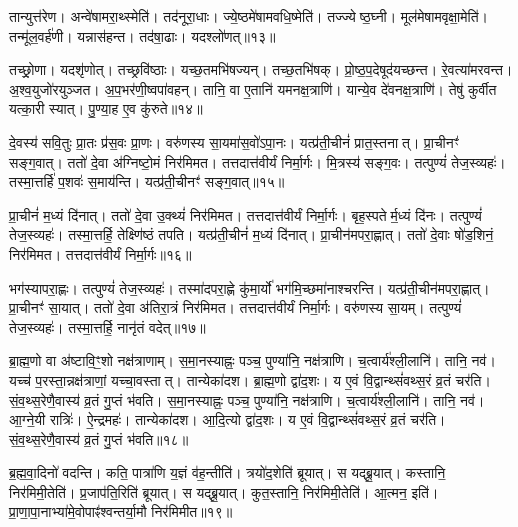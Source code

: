 तान्युत्त॑रेण।
अन्वे॑षामरा॒थ्स्मेति॑।
तद॑नूरा॒धाः।
ज्ये॒ष्ठमे॑षाम\-वधि॒ष्मेति॑।
तज्ज्येष्ठ॒घ्नी।
मूल॑मेषामवृक्षा॒मेति॑।
तन्मू॑ल॒वर्\mbox{}ह॑णी।
यन्नास॑हन्त।
तद॑षा॒ढाः।
यदश्लो॑णत्॥१३॥

तच्छ्रो॒णा।
यदशृ॑णोत्।
तच्छ्रवि॑ष्ठाः।
यच्छ॒तमभि॑षज्यन्।
तच्छ॒तभि॑षक्।
प्रो॒ष्ठ॒प॒देषूद॑यच्छन्त।
रे॒वत्या॑मरवन्त।
अ॒श्व॒युजो॑रयुञ्जत।
अ॒प॒भर॑णी॒ष्वपा॑वहन्।
तानि॒ वा ए॒तानि॑ यमनक्ष॒त्राणि॑।
यान्ये॒व दे॑वनक्ष॒त्राणि॑।
तेषु॑ कुर्वीत यत्का॒री स्यात्।
पु॒ण्या॒ह ए॒व कु॑रुते॥१४॥

दे॒वस्य॑ सवि॒तुः प्रा॒तः प्र॑स॒वः प्रा॒णः।
वरु॑णस्य सा॒यमा॑स॒वो॑\-ऽपा॒नः।
यत्प्र॑ती॒चीनं॑ प्रात॒स्तनात्।
प्रा॒चीनꣳ॑ सङ्ग॒वात्।
ततो॑ दे॒वा अ॑ग्निष्टो॒मं निर॑मिमत।
तत्तदात्त॑वीर्यं निर्मा॒र्गः।
मि॒त्रस्य॑ सङ्ग॒वः।
तत्पुण्यं॑ तेज॒स्व्यहः॑।
तस्मा॒त्तर्\mbox{}हि॑ प॒शवः॑ स॒माय॑न्ति।
यत्प्र॑ती॒चीनꣳ॑ सङ्ग॒वात्॥१५॥

प्रा॒चीनं॑ म॒ध्यं दि॑नात्।
ततो॑ दे॒वा उ॒क्थ्यं॑ निर॑मिमत।
तत्तदात्त॑वीर्यं निर्मा॒र्गः।
बृह॒स्पतेर्म॒ध्यं दि॑नः।
तत्पुण्यं॑ तेज॒स्व्यहः॑।
तस्मा॒त्तर्\mbox{}हि॒ तेक्ष्णि॑ष्ठं तपति।
यत्प्र॑ती॒चीनं॑ म॒ध्यं दि॑नात्।
प्रा॒चीन॑मपरा॒ह्णात्।
ततो॑ दे॒वाः षो॑ड॒शिनं॒ निर॑मिमत।
तत्तदात्त॑वीर्यं निर्मा॒र्गः॥१६॥

भग॑स्यापरा॒ह्णः।
तत्पुण्यं॑ तेज॒स्व्यहः॑।
तस्मा॑दपरा॒ह्णे कु॑मा॒र्यो॑ भग॑मि॒च्छमा॑नाश्चरन्ति।
यत्प्र॑ती॒चीन॑मपरा॒ह्णात्।
प्रा॒चीनꣳ॑ सा॒यात्।
ततो॑ दे॒वा अ॑तिरा॒त्रं निर॑मिमत।
तत्तदात्त॑वीर्यं निर्मा॒र्गः।
वरु॑णस्य सा॒यम्।
तत्पुण्यं॑ तेज॒स्व्यहः॑।
तस्मा॒त्तर्\mbox{}हि॒ नानृ॑तं वदेत्॥१७॥

ब्रा॒ह्म॒णो वा अ॑ष्टावि॒ꣳ॒शो नक्ष॑त्राणाम्।
स॒मा॒नस्याह्नः॒ पञ्च॒ पुण्या॑नि॒ नक्ष॑त्राणि।
च॒त्वार्य॑श्ली॒लानि॑।
तानि॒ नव॑।
यच्च॑ प॒रस्ता॒न्नक्ष॑त्राणां॒ यच्चा॒वस्तात्।
तान्येका॑दश।
ब्रा॒ह्म॒णो द्वा॑द॒शः।
य ए॒वं वि॒द्वान्थ्सं॑वथ्स॒रं व्र॒तं चर॑ति।
सं॒व॒थ्स॒रेणै॒वास्य॑ व्र॒तं गु॒प्तं भ॑वति।
स॒मा॒नस्याह्नः॒ पञ्च॒ पुण्या॑नि॒ नक्ष॑त्राणि।
च॒त्वार्य॑श्ली॒लानि॑।
तानि॒ नव॑।
आ॒ग्ने॒यी रात्रिः॑।
ऐ॒न्द्रमहः॑।
तान्येका॑दश।
आ॒दि॒त्यो द्वा॑द॒शः।
य ए॒वं वि॒द्वान्थ्सं॑वथ्स॒रं व्र॒तं चर॑ति।
सं॒व॒थ्स॒रेणै॒वास्य॑ व्र॒तं गु॒प्तं भ॑वति॥१८॥\anuvakamend[स॒ङ्ग॒वाथ्षो॑ड॒शिनं॒ निर॑मिमत॒ तत्तदात्त॑वीर्यं निर्मा॒र्गो व॑देद्भवति समा॒नस्याह्नः॒ पञ्च॒ पुण्या॑नि॒ नक्ष॑त्राण्य॒ष्टौ च॑]

ब्र॒ह्म॒वा॒दिनो॑ वदन्ति।
कति॒ पात्रा॑णि य॒ज्ञं व॑ह॒न्तीति॑।
त्रयो॑द॒शेति॑ ब्रूयात्।
स यद्ब्रू॒यात्।
कस्तानि॒ निर॑मिमी॒तेति॑।
प्र॒जाप॑ति॒रिति॑ ब्रूयात्।
स यद्ब्रू॒यात्।
कुत॒स्तानि॒ निर॑मिमी॒तेति॑।
आ॒त्मन॒ इति॑।
प्रा॒णा॒पा॒नाभ्या॑मे॒वोपाꣴ॑\-श्वन्तर्या॒मौ निर॑मिमीत॥१९॥

